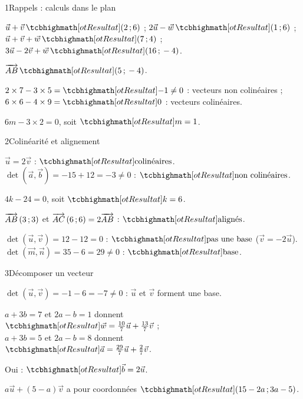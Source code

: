 

\begin{deuxcolonnes}

\begin{corrige}{1}{Rappels : calculs dans le plan}
\begin{questions}
  \item $\vec u+\vec v\,\res{(2\pv6)}$ ; $2\vec u-\vec w\,\res{(1\pv6)}$ ;\\ $\vec u+\vec v+\vec w\,\res{(7\pv4)}$ ;
    $3\vec u-2\vec v+\vec w\,\res{(16\pv-4)}$.
  \item $\vect{AB}\,\res{(5\pv-4)}$.
  \item $2\times7-3\times5=\res{-1}\neq0$ : vecteurs non colinéaires ;\\ $6\times6-4\times9=\res{0}$ : vecteurs colinéaires.
  \item $6m-3\times2=0$, soit $\res{m=1}$.
\end{questions}
\end{corrige}

\begin{corrige}{2}{Colinéarité et alignement}
\begin{questions}
  \item $\vec u=2\vec v$ : $\res{\text{colinéaires}}$. $\det(\vec a,\vec b)=-15+12=-3\neq0$ : $\res{\text{non colinéaires}}$.
  \item $4k-24=0$, soit $\res{k=6}$.
  \item $\overrightarrow{AB}\,(3\,{;}\,3)$ et $\overrightarrow{AC}\,(6\,{;}\,6)=2\overrightarrow{AB}$ : $\res{\text{alignés}}$.
  \item $\det(\vec u,\vec v)=12-12=0$ : $\res{\text{pas une base}}$ ($\vec v=-2\vec u$). $\det(\vec m,\vec n)=35-6=29\neq0$ :
    $\res{\text{base}}$.
\end{questions}
\end{corrige}

\begin{corrige}{3}{Décomposer un vecteur}
\begin{questions}
  \item $\det(\vec u,\vec v)=-1-6=-7\neq0$ : $\vec u$ et $\vec v$ forment une base.
  \item $a+3b=7$ et $2a-b=1$ donnent\\ $\res{\vec w=\tfrac{10}{7}\vec u+\tfrac{13}{7}\vec v}$ ;\\
    $a+3b=5$ et $2a-b=8$ donnent\\ $\res{\vec a=\tfrac{29}{7}\vec u+\tfrac27\vec v}$.
  \item Oui : $\res{\vec b=2\vec u}$.
  \item $a\vec u+(5-a)\vec v$ a pour coordonnées $\res{(15-2a\pv3a-5)}$.
\end{questions}
\end{corrige}


\end{deuxcolonnes}
